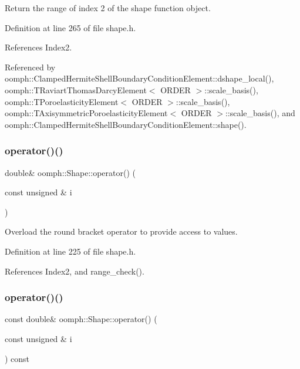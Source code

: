 Return the range of index 2 of the shape function object. 



Definition at line 265 of file shape.\+h.



References Index2.



Referenced by oomph\+::\+Clamped\+Hermite\+Shell\+Boundary\+Condition\+Element\+::dshape\+\_\+local(), oomph\+::\+T\+Raviart\+Thomas\+Darcy\+Element$<$ O\+R\+D\+E\+R $>$\+::scale\+\_\+basis(), oomph\+::\+T\+Poroelasticity\+Element$<$ O\+R\+D\+E\+R $>$\+::scale\+\_\+basis(), oomph\+::\+T\+Axisymmetric\+Poroelasticity\+Element$<$ O\+R\+D\+E\+R $>$\+::scale\+\_\+basis(), and oomph\+::\+Clamped\+Hermite\+Shell\+Boundary\+Condition\+Element\+::shape().

\mbox{\label{classoomph_1_1Shape_ab056b07f2926608b77536a15a2b3ffaf}} 
\subsubsection{\texorpdfstring{operator()()}{operator()()}\hspace{0.1cm}{\footnotesize\ttfamily [1/4]}}
{\footnotesize\ttfamily double\& oomph\+::\+Shape\+::operator() (\begin{DoxyParamCaption}\item[{const unsigned \&}]{i }\end{DoxyParamCaption})\hspace{0.3cm}{\ttfamily [inline]}}



Overload the round bracket operator to provide access to values. 



Definition at line 225 of file shape.\+h.



References Index2, and range\+\_\+check().

\mbox{\label{classoomph_1_1Shape_a317e00ba233add451d36b8208d12087b}} 
\subsubsection{\texorpdfstring{operator()()}{operator()()}\hspace{0.1cm}{\footnotesize\ttfamily [2/4]}}
{\footnotesize\ttfamily const double\& oomph\+::\+Shape\+::operator() (\begin{DoxyParamCaption}\item[{const unsigned \&}]{i }\end{DoxyParamCaption}) const\hspace{0.3cm}{\ttfamily [inline]}}




